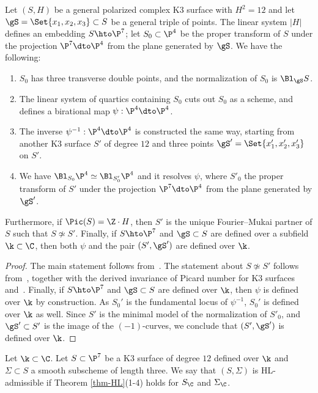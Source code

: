 \begin{theorem}
\notready\label{thm-HL}
Let $(S,H)$ be a general polarized complex K3 surface with $H^2 = 12$
and let $\gS = \Set{ x_1,x_2,x_3 } \subset S$ be a general triple of points.
The linear system $|H|$ defines an embedding $S \hto \P^7$;
let $S_0 \subset \P^4$ be the proper transform
of $S$ under the projection $\P^7 \dto \P^4$
from the plane generated by $\gS$.
We have the following:
\begin{enumerate}
\item $S_0$ has three transverse double points,
and the normalization of $S_0$ is $\Bl_\gS S$.
\item The linear system of quartics containing $S_0$ cuts out
$S_0$ as a scheme, and
defines a birational map
$\psi: \P^4 \dto \P^4$.
\item
The inverse
$\psi^{-1}: \P^4 \dto \P^4$
is constructed the same way,
starting from another K3 surface $S'$ of degree $12$
and three points $\gS' = \Set{ x_1', x_2', x_3' }$ on $S'$.
\item We have $\Bl_{S_0}\P^4 \simeq \Bl_{S'_0}\P^4$
and it resolves $\psi$,
where $S'_0$ the proper transform
of $S'$ under the projection $\P^7 \dto \P^4$
from the plane generated by $\gS'$.
\end{enumerate}
Furthermore, if $\Pic(S) = \Z \cdot H$,
then $S'$ is the unique Fourier--Mukai partner of $S$ such that
$S \not\simeq S'$.
Finally, if $S \hto \P^7$ and $\gS \subset S$ are defined over a subfield $\k \subset \C$,
then both $\psi$ and the pair $(S',\gS')$ are defined over $\k$.
\end{theorem}
\begin{proof}
The main statement follows from~\cite[\S1.1, Theorem 2.1]{HassettLai}.
The statement about $S \not\simeq S'$ follows from~\cite[Theorem 3.1]{HassettLai},
together with the derived invariance of Picard number for K3 surfaces
and~\cite[Proposition 1.10]{OguisoFM}.
Finally, if $S \hto \P^7$ and $\gS \subset S$ are defined over $\k$,
then $\psi$ is defined over $\k$ by construction.
As $S_0'$ is the fundamental locus of $\psi^{-1}$,
$S_0'$ is defined over $\k$ as well.
Since $S'$ is the minimal model of the normalization of $S'_0$,
and $\gS' \subset S'$ is the image of the $(-1)$-curves,
we conclude that $(S',\gS')$ is defined over $\k$.
\end{proof}

Let $\k \subset \C$.
Let $S \subset \P^7$ be a K3 surface
of degree $12$ defined over $\k$
and $\Sigma \subset S$
a smooth subscheme of length three.
We say that $(S, \Sigma)$ is HL-admissible
if
Theorem \ref{thm-HL}(1-4) holds
    for $S_\C$ and $\Sigma_\C$.

